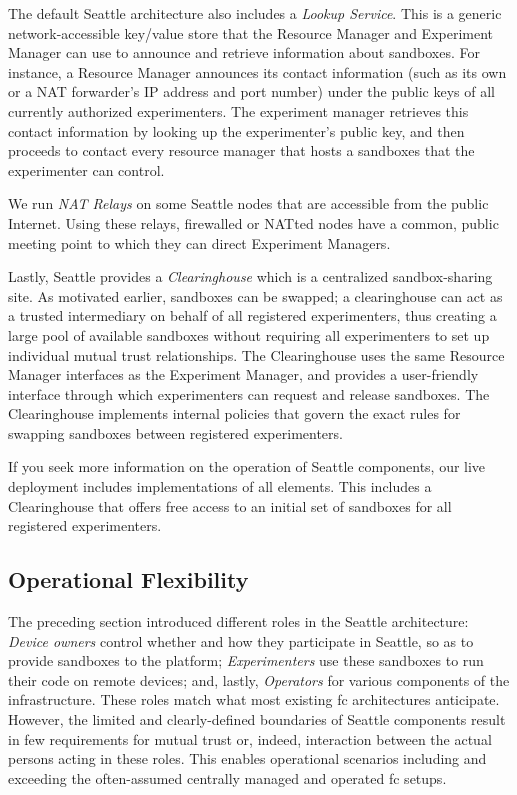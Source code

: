 
The default Seattle architecture also includes a
\textit{Lookup Service}. This is a generic network-accessible
key/value store that the Resource Manager and Experiment Manager
can use to announce and retrieve information about sandboxes.
For instance, a Resource Manager announces its contact information
(such as its own or a \gls{NAT} forwarder's \gls{IP} address and port number) under
the public keys of all currently authorized experimenters.
The experiment manager retrieves this contact information by looking up
the experimenter's public key, and then
proceeds to contact every resource manager that hosts a sandboxes
that the experimenter can control.

We run \textit{\gls{NAT} Relays} on some Seattle nodes that are
accessible from the public Internet. Using these relays, firewalled
or \gls{NAT}ted nodes have a common, public meeting point to which they
can direct Experiment Managers.

Lastly, Seattle provides a \textit{Clearinghouse} which is a
centralized sandbox-sharing site. As motivated earlier,
sandboxes can be swapped; a clearinghouse can act as a trusted
intermediary on behalf of all registered experimenters, thus creating
a large pool of available sandboxes without requiring all experimenters to
set up individual mutual trust relationships.
The Clearinghouse uses the same Resource Manager interfaces as the
Experiment Manager, and provides a user-friendly interface through which
experimenters can request and release sandboxes.
The Clearinghouse implements internal policies
that govern the exact rules for swapping sandboxes between
registered experimenters.

If you seek more information on the operation of Seattle components, our
live deployment includes implementations of all elements. This includes a
Clearinghouse that offers free access to an initial set of sandboxes
for all registered experimenters.

\subsection{Operational Flexibility}\label{sec-op-flex}

The preceding section introduced different roles
in the Seattle architecture:
\textit{Device owners} control whether and how they participate
in Seattle, so as to provide sandboxes to the platform;
\textit{Experimenters} use these sandboxes to run their code
on remote devices; and,
lastly, \textit{Operators} for various components
of the infrastructure.
These roles match what most existing \gls{fc} architectures
anticipate.
However, the limited and clearly-defined boundaries of Seattle
components result in few requirements for mutual trust or, indeed,
interaction between
the actual persons acting in these roles. This enables operational
scenarios including and exceeding the often-assumed centrally managed
and operated \gls{fc} setups.


